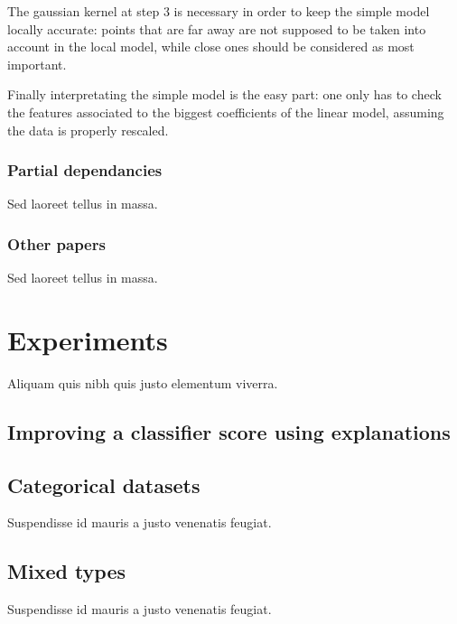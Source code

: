 \documentclass[a4paper,11pt]{kth-mag}
\begin{document}
The gaussian kernel at step 3 is necessary in order to keep the simple model locally accurate: points that are far away are not supposed to be taken into account in the local model, while close ones should be considered as most important.

Finally interpretating the simple model is the easy part: one only has to check the features associated to the biggest coefficients of the linear model, assuming the data is properly rescaled.

\subsection{Partial dependancies}
Sed laoreet tellus in massa.

\subsection{Other papers}
Sed laoreet tellus in massa.


\chapter{Experiments}
Aliquam quis nibh quis justo elementum viverra.

\section{Improving a classifier score using explanations}



\section{Categorical datasets}
Suspendisse id mauris a justo venenatis feugiat.

\section{Mixed types}
Suspendisse id mauris a justo venenatis feugiat.

\nocite{lime}
\nocite{mythos}
\nocite{treeinterpreter}
\nocite{explvect}
\nocite{gametheory}
\nocite{euregulation}
\nocite{healthcare}
\nocite{trust}
\nocite{documentclassif}
\nocite{explainingclassif}
\nocite{ice}
\nocite{evolutionnary}
\nocite{interpretingusing}
\nocite{breastcancer}
\nocite{sensitivity}

\printbibliography
\end{document}
